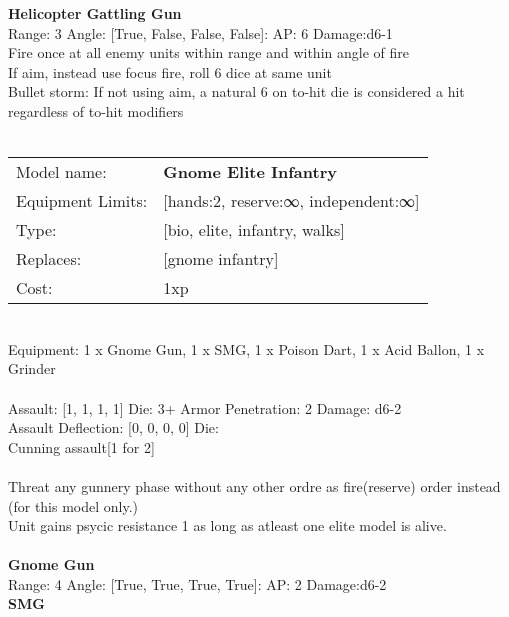{\bf Helicopter Gattling Gun } \\



Range: 3  Angle: [True, False, False, False]: AP: 6 Damage:d6-1 \\
Fire once at all enemy units within range and within angle of fire\\ 
If aim, instead use focus fire, roll 6 dice at same unit\\ 
Bullet storm: If not using aim, a natural 6 on to-hit die is considered a hit regardless of to-hit modifiers\\ 




 
\ \\

\noindent
\begin{tabular}{ll}
Model name: &{\bf Gnome Elite Infantry } \\
Equipment Limits: &[hands:2, reserve:∞, independent:∞] \\
Type: &[bio, elite, infantry, walks] \\
Replaces: &[gnome infantry] \\
Cost: & 1xp\\
\end{tabular}
\ \\
Equipment: 1 x Gnome Gun, 1 x SMG, 1 x Poison Dart, 1 x Acid Ballon, 1 x Grinder \\
\ \\
Assault: [1, 1, 1, 1] Die: 3+ Armor Penetration: 2 Damage: d6-2 \\
Assault Deflection: [0, 0, 0, 0] Die: \\
\indent Cunning assault[1 for 2]\\ 
 
\ \\
Threat any gunnery phase without any other ordre as fire(reserve) order instead (for this model only.)\\ 
Unit gains psycic resistance 1 as long as atleast one elite model is alive.\\ 

\ \\
{\bf Gnome Gun } \\



Range: 4  Angle: [True, True, True, True]: AP: 2 Damage:d6-2 \\




{\bf SMG } \\



